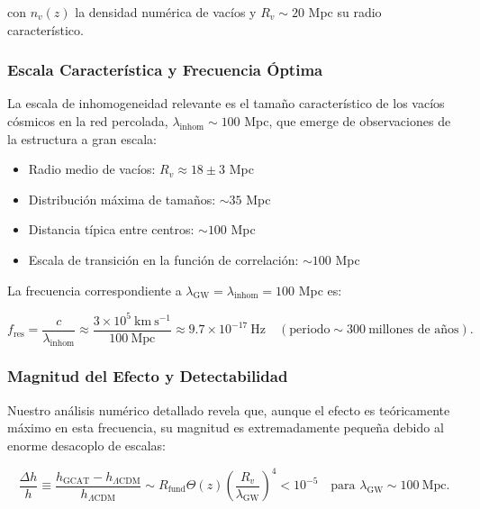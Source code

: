 \documentclass[12pt, a4paper]{article}
\theoremstyle{plain}
\theoremstyle{definition}
\begin{document}
con $n_v(z)$ la densidad numérica de vacíos y $R_v \sim 20$ Mpc su radio característico.

\subsubsection{Escala Característica y Frecuencia Óptima}

La escala de inhomogeneidad relevante es el tamaño característico de los vacíos cósmicos en la red percolada, $\lambda_{\mathrm{inhom}} \sim 100$ Mpc, que emerge de observaciones de la estructura a gran escala:

\begin{itemize}
    \item Radio medio de vacíos: $R_v \approx 18 \pm 3$ Mpc
    \item Distribución máxima de tamaños: $\sim 35$ Mpc
    \item Distancia típica entre centros: $\sim 100$ Mpc
    \item Escala de transición en la función de correlación: $\sim 100$ Mpc
\end{itemize}

La frecuencia correspondiente a $\lambda_{\mathrm{GW}} = \lambda_{\mathrm{inhom}} = 100$ Mpc es:

\begin{equation}
f_{\mathrm{res}} = \frac{c}{\lambda_{\mathrm{inhom}}} \approx 
\frac{3 \times 10^5~\mathrm{km~s^{-1}}}{100~\mathrm{Mpc}} \approx 
9.7 \times 10^{-17}~\mathrm{Hz} \quad (\text{periodo} \sim 300~\text{millones de años}).
\label{eq:gw_characteristic_freq}
\end{equation}

\subsubsection{Magnitud del Efecto y Detectabilidad}

Nuestro análisis numérico detallado revela que, aunque el efecto es teóricamente máximo en esta frecuencia, su magnitud es extremadamente pequeña debido al enorme desacoplo de escalas:

\begin{equation}
\frac{\Delta h}{h} \equiv \frac{h_{\mathrm{GCAT}} - h_{\Lambda\mathrm{CDM}}}{h_{\Lambda\mathrm{CDM}}} \sim 
R_{\mathrm{fund}} \Theta(z) \left(\frac{R_v}{\lambda_{\mathrm{GW}}}\right)^4 < 10^{-5} \quad \text{para } \lambda_{\mathrm{GW}} \sim 100~\mathrm{Mpc}.
\end{equation}
\end{document}
